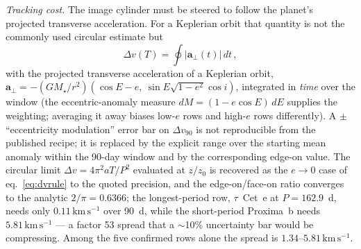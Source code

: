 \documentclass[twocolumn,10pt]{article}
\begin{document}
\emph{Tracking cost.} The image cylinder must be steered to follow the
planet's projected transverse acceleration. For a Keplerian orbit that quantity
is not the commonly used circular estimate but
\begin{equation}
\Delta v(T)=\oint \left|\mathbf{a}_\perp(t)\right|\,dt\,,
\label{eq:dvrule}
\end{equation}
with the projected transverse acceleration of a Keplerian orbit,
$\mathbf{a}_\perp=-(GM_\star/r^2)(\cos E-e,\ \sin E\sqrt{1-e^2}\cos i)$,
integrated in \emph{time} over the window (the eccentric-anomaly measure
$dM=(1-e\cos E)\,dE$ supplies the weighting; averaging it away biases low-$e$
rows and high-$e$ rows differently). A $\pm\,$``eccentricity modulation''
error bar on $\Delta v_{90}$ is not reproducible from the published recipe; it is replaced by the
explicit range over the starting mean anomaly within the 90-day window and by the
corresponding edge-on value. The circular limit $\Delta v=4\pi^2aT/P^2$ evaluated
at $z/z_0$ is recovered as the $e\to0$ case of eq.~\ref{eq:dvrule} to the quoted
precision, and the edge-on/face-on ratio converges to the analytic $2/\pi=0.6366$;
the longest-period row, $\tau$~Cet~e
at $P=162.9$~d, needs only $0.11\,\mathrm{km\,s^{-1}}$ over 90~d, while the
short-period Proxima~b needs $5.81\,\mathrm{km\,s^{-1}}$ --- a factor 53 spread
that a $\sim$10\% uncertainty bar would be compressing. Among the
five confirmed rows alone the spread is $1.34$--$5.81\,\mathrm{km\,s^{-1}}$.
\end{document}
